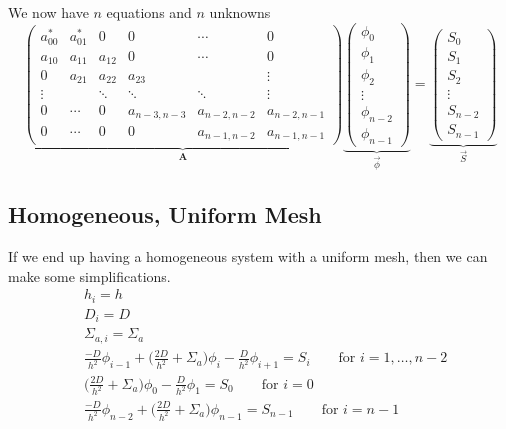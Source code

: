 \documentclass[12pt]{article}
\newcommand{\ve}[1]{\ensuremath{\mathbf{#1}}}
\begin{document}
We now have $n$ equations and $n$ unknowns
\begin{equation}
\underbrace{\begin{pmatrix}
a_{00}^* & a_{01}^* & 0      & 0 & \cdots & 0 \\
a_{10}   & a_{11}   & a_{12} & 0 & \cdots & 0 \\
0        & a_{21}   & a_{22}   & a_{23} &  & \vdots \\
\vdots        &    & \ddots  & \ddots & \ddots & \vdots \\
0 & \cdots & 0 & a_{n-3,n-3}   & a_{n-2,n-2} & a_{n-2,n-1} \\
0        & \cdots   & 0   & 0 & a_{n-1,n-2} & a_{n-1,n-1} 
\end{pmatrix}}_{\ve{A}}
%
\underbrace{\begin{pmatrix}\phi_0 \\ \phi_1 \\ \phi_2 \\ \vdots \\ \phi_{n-2} \\ \phi_{n-1} \end{pmatrix}}_{\vec{\phi}} =
%
\underbrace{\begin{pmatrix}S_0 \\ S_1 \\ S_2 \\ \vdots \\ S_{n-2} \\ S_{n-1} \end{pmatrix}}_{\vec{S}}
\end{equation}

\subsection{Homogeneous, Uniform Mesh}

If we end up having a homogeneous system with a uniform mesh, then we can make some simplifications.
%
\begin{align}
&h_i = h \nonumber \\
&D_i = D \nonumber \\
&\Sigma_{a,i} = \Sigma_a \nonumber \\
%
&\frac{-D}{h^2}\phi_{i-1} + \biggl(\frac{2D}{h^2} + \Sigma_a \biggr)\phi_i - \frac{D}{h^2}\phi_{i+1} = S_i \qquad \text{for } i = 1, \dots, n-2 \nonumber \\
%
&\biggl(\frac{2D}{h^2} + \Sigma_a \biggr) \phi_0 - \frac{D}{h^2}\phi_{1} = S_0 \qquad \text{for } i = 0 \nonumber \\
%
&\frac{-D}{h^2}\phi_{n-2} + \biggl(\frac{2D}{h^2} + \Sigma_a \biggr)\phi_{n-1} = S_{n-1} \qquad \text{for } i = n-1 \nonumber
\end{align}
\end{document}

